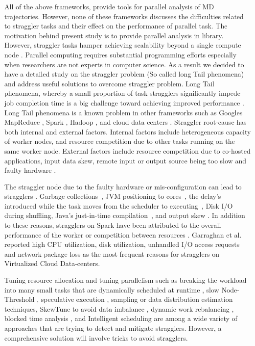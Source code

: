 All of the above frameworks, provide tools for parallel analysis of MD trajectories. 
However, none of these frameworks discusses the difficulties related to straggler tasks and their effect on the performance of parallel task.
The motivation behind present study is to provide parallel analysis in  library.
However, straggler tasks hamper achieving scalability beyond a single compute node \cite{Khoshlessan:2017ab}. 
Parallel computing requires substantial programming efforts especially when researchers are not experts in computer science.
As a result we decided to have a detailed study on the straggler problem (So called long Tail phenomena) and address useful solutions to overcome straggler problem.
Long Tail phenomena, whereby a small proportion of task stragglers significantly impede job completion time is a big challenge toward achieving improved performance \cite{Garraghan2016}.
Long Tail phenomena is a known problem in other frameworks such as Google\textsc{}s MapReduce \cite{Dean2004}, Spark \cite{Kyong2017,Ousterhout2017,Gittens2016}, Hadoop \cite{Dean2004}, and cloud data centers \cite{Schmidt2016}. Straggler root-cause has both internal and external factors. 
Internal factors include heterogeneous capacity of worker nodes, and resource competition due to other tasks running on the same worker node. 
External factors include resource competition due to co-hosted applications, input data skew, remote input or output source being too slow and faulty hardware \cite{Chen2014}.

The straggler node due to the faulty hardware or mis-configuration can lead to stragglers \cite{Dean2004}. 
Garbage collections~\cite{Kyong2017,Ousterhout2017}, JVM positioning to cores~\cite{Kyong2017}, the delay's introduced while the task moves from the scheduler to executing~\cite{Gittens2016}, Disk I/O during shuffling, Java's just-in-time compilation~\cite{Ousterhout2017}, and output skew \cite{Ousterhout2017}. 
In addition to these reasons, stragglers on Spark have been attributed to the overall performance of the worker or competition between resources \cite{Yang2016}.
Garraghan et al. \cite{Garraghan2016} reported high CPU utilization, disk utilization, unhandled I/O access requests and network package loss as the most frequent reasons for stragglers on Virtualized Cloud Data-centers.

Tuning resource allocation and tuning parallelism such as breaking the workload into many small tasks that are dynamically scheduled at runtime \cite{Rosen2012}, slow Node-Threshold \cite{Dean2004}, speculative execution \cite{Dean2004}, sampling or data distribution estimation techniques, SkewTune to avoid data imbalance \cite{Kwon2012}, dynamic work rebalancing \cite{Schmidt2016}, blocked time analysis \cite{Ousterhout2015}, and Intelligent scheduling \cite{AWE-WQ2014} are among a wide variety of approaches that are trying to detect and mitigate stragglers. 
However, a comprehensive solution will involve tricks to avoid stragglers. 

